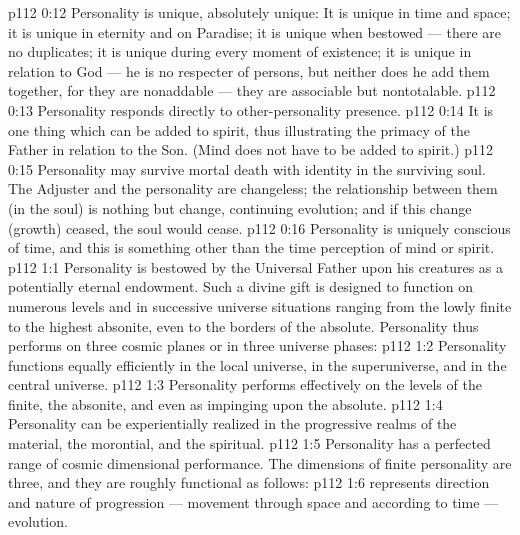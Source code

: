 \vs p112 0:12 \bibnobreakspace Personality is unique, absolutely unique: It is unique in time and space; it is unique in eternity and on Paradise; it is unique when bestowed --- there are no duplicates; it is unique during every moment of existence; it is unique in relation to God --- he is no respecter of persons, but neither does he add them together, for they are nonaddable --- they are associable but nontotalable.
\vs p112 0:13 \bibnobreakspace Personality responds directly to other\hyp{}personality presence.
\vs p112 0:14 \bibnobreakspace It is one thing which can be added to spirit, thus illustrating the primacy of the Father in relation to the Son. (Mind does not have to be added to spirit.)
\vs p112 0:15 \bibnobreakspace Personality may survive mortal death with identity in the surviving soul. The Adjuster and the personality are changeless; the relationship between them (in the soul) is nothing but change, continuing evolution; and if this change (growth) ceased, the soul would cease.
\vs p112 0:16 \bibnobreakspace Personality is uniquely conscious of time, and this is something other than the time perception of mind or spirit.
\vs p112 1:1 Personality is bestowed by the Universal Father upon his creatures as a potentially eternal endowment. Such a divine gift is designed to function on numerous levels and in successive universe situations ranging from the lowly finite to the highest absonite, even to the borders of the absolute. Personality thus performs on three cosmic planes or in three universe phases:
\vs p112 1:2 \bibnobreakspace {} Personality functions equally efficiently in the local universe, in the superuniverse, and in the central universe.
\vs p112 1:3 \bibnobreakspace {} Personality performs effectively on the levels of the finite, the absonite, and even as impinging upon the absolute.
\vs p112 1:4 \bibnobreakspace {} Personality can be experientially realized in the progressive realms of the material, the morontial, and the spiritual.
\vs p112 1:5 \pc Personality has a perfected range of cosmic dimensional performance. The dimensions of finite personality are three, and they are roughly functional as follows:
\vs p112 1:6 \bibnobreakspace {} represents direction and nature of progression --- movement through space and according to time --- evolution.
